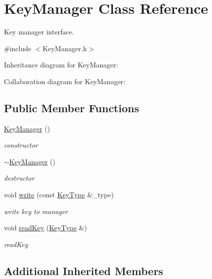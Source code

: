 \hypertarget{class_key_manager}{\section{Key\+Manager Class Reference}
\label{class_key_manager}
}


Key manager interface.  




{\ttfamily \#include $<$Key\+Manager.\+h$>$}



Inheritance diagram for Key\+Manager\+:


Collaboration diagram for Key\+Manager\+:
\subsection*{Public Member Functions}
\begin{DoxyCompactItemize}
\item 
\hyperlink{class_key_manager_afc76e8b939fa0af860e935d9d498739f}{Key\+Manager} ()
\begin{DoxyCompactList}\small\item\em constructor \end{DoxyCompactList}\item 
\hyperlink{class_key_manager_a08ede7dd08d559c6e882c7ad9ad228f2}{$\sim$\+Key\+Manager} ()
\begin{DoxyCompactList}\small\item\em destructor \end{DoxyCompactList}\item 
void \hyperlink{class_key_manager_a19bea6cdcb3145626867432776ccffc9}{write} (const \hyperlink{_i_key_type_8h_aab0feaba617470cb4aa830dc5935238c}{Key\+Type} \&\+\_\+type)
\begin{DoxyCompactList}\small\item\em write key to manager \end{DoxyCompactList}\item 
void \hyperlink{class_key_manager_a4a0be9ad9f14de2f8fbf9563d4724c14}{read\+Key} (\hyperlink{_i_key_type_8h_aab0feaba617470cb4aa830dc5935238c}{Key\+Type} \&)
\begin{DoxyCompactList}\small\item\em read\+Key \end{DoxyCompactList}\end{DoxyCompactItemize}
\subsection*{Additional Inherited Members}


